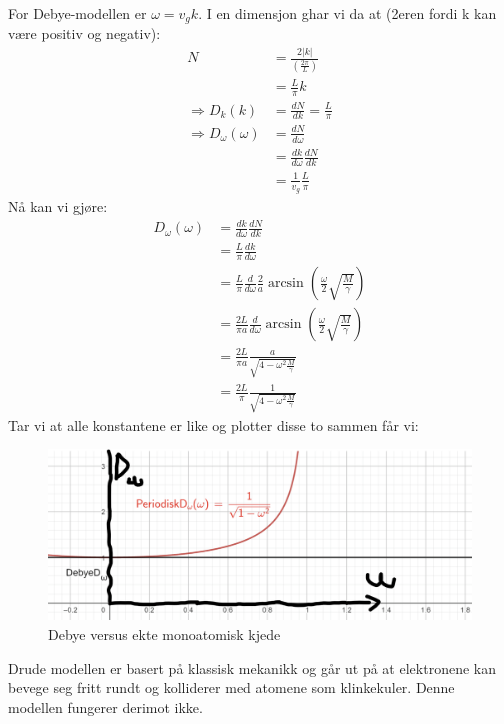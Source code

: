 \documentclass{article}
\begin{document}
For Debye-modellen er $\omega = v_g k$. I en dimensjon ghar vi da at (2eren fordi k kan være positiv og negativ):
\begin{align}
    N &= \frac{2|k|}{\left(\frac{2\pi}{L}\right)}\\
      &= \frac{L}{\pi} k\\
    \Rightarrow D_k(k) &= \frac{dN}{dk} = \frac{L}{\pi}\\
    \Rightarrow D_\omega(\omega) &= \frac{dN}{d\omega} \\
    &= \frac{dk}{d\omega}\frac{dN}{dk} \\
    &= \frac{1}{v_g}\frac{L}{\pi}
\end{align}
Nå kan vi gjøre:
\begin{align}
     D_\omega(\omega) &= \frac{dk}{d\omega} \frac{dN}{dk} \\
     &=\frac{L}{\pi } \frac{dk}{d\omega} \\
     &= \frac{L}{\pi } \frac{d}{d\omega} \frac{2}{a}\arcsin{\left(\frac{\omega}{2}\sqrt{\frac{M}{\gamma}}\right)}\\
     &= \frac{2L}{\pi a} \frac{d}{d\omega} \arcsin{\left(\frac{\omega}{2}\sqrt{\frac{M}{\gamma}}\right)}\\
     &= \frac{2L}{\pi a}  \frac{a}{\sqrt{4-\omega^2 \frac{M}{\gamma}}}\\
     &= \frac{2L}{\pi}  \frac{1}{\sqrt{4-\omega^2 \frac{M}{\gamma}}}
\end{align}
Tar vi at alle konstantene er like og plotter disse to sammen får vi:
\begin{figure}[H]
    \centering
    \includegraphics[width=0.4\linewidth]{bilder_lf/debye_versus_ekte_monoatomisk_kjede.png}
    \caption{Debye versus ekte monoatomisk kjede}
    \label{fig:debye_versus_ekte_monoatomisk_kjede}
\end{figure}
\nyside
{}
Drude modellen er basert på klassisk mekanikk og går ut på at elektronene kan bevege seg fritt rundt og kolliderer med atomene som klinkekuler. Denne modellen fungerer derimot ikke.
\end{document}
